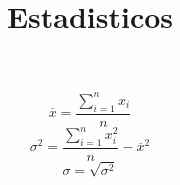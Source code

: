 
\title{Estadisticos}



\begin{equation}
    \overline{x} = \dfrac{\sum\limits_{i=1}^n{x_i}}{n}
\end{equation}
\begin{equation}
    \sigma^2 = \dfrac{\sum\limits_{i=1}^n{x^2_i}}{n}-\overline{x}^2
\end{equation}
\begin{equation}
    \sigma = \sqrt{\sigma^2}
\end{equation}
